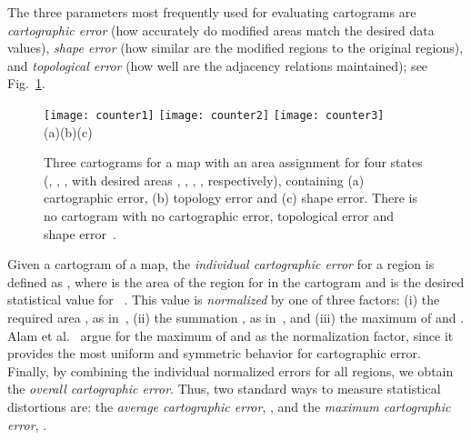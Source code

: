 \documentclass{egpubl}
\begin{document}
The three parameters most frequently used for evaluating cartograms are {\em cartographic error} (how accurately do modified areas match the desired data values), {\em shape error} (how similar are  the modified regions to the original regions), and {\em topological error} (how well are the adjacency relations maintained); see Fig.~\ref{fig:counter}.


\begin{figure}[h]
\centering
\texttt{[image: counter1]}
\hspace{0.02cm}
\texttt{[image: counter2]}
\hspace{0.02cm}
\texttt{[image: counter3]}\\
(a)\hspace{0.14\textwidth}(b)\hspace{0.14\textwidth}(c)
\caption{ Three cartograms for a map with an area assignment for four states
 (, , ,  with desired areas , , , , respectively),
 containing (a) cartographic error, (b) topology error and (c) shape error.
There is no cartogram with no cartographic error, topological error and shape error~\cite{AKV15}.}
\label{fig:counter}
\end{figure}




Given a cartogram of a map, the \textit{individual cartographic error} for a region  is defined as
 , where  is the area of the region for  in the cartogram and  is the desired statistical value for ~\cite{KNPS03}. This value is {\em normalized} by one of three factors:  (i) the required area , as in~\cite{ks07,BSV12}, (ii) the summation , as in~\cite{KNP04}, and
(iii) the maximum of  and . Alam et al.~\cite{AKV15} argue for the maximum of  and  as the normalization factor, since it provides the most uniform and symmetric behavior for cartographic error. Finally, by combining the individual normalized errors for all regions, we obtain the \textit{overall cartographic error}. Thus, two standard ways to measure statistical distortions are: the \textit{average cartographic error}, , and the \textit{maximum cartographic error}, .
\end{document}
